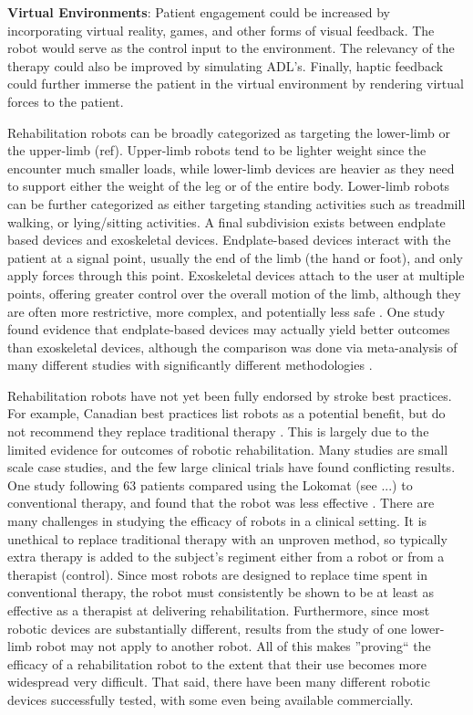 \documentclass[12pt]{report}
\begin{document}
	\textbf{Virtual Environments}: Patient engagement could be increased by incorporating virtual reality, games, and other forms of visual feedback. The robot would serve as the control input to the environment. The relevancy of the therapy could also be improved by simulating ADL's. Finally, haptic feedback could further immerse the patient in the virtual environment by rendering virtual forces to the patient.
	
	Rehabilitation robots can be broadly categorized as targeting the lower-limb or the upper-limb (ref). Upper-limb robots tend to be lighter weight since the encounter much smaller loads, while lower-limb devices are heavier as they need to support either the weight of the leg or of the entire body. Lower-limb robots can be further categorized as either targeting standing activities such as treadmill walking, or lying/sitting activities. A final subdivision exists between endplate based devices and exoskeletal devices. Endplate-based devices interact with the patient at a signal point, usually the end of the limb (the hand or foot), and only apply forces through this point. Exoskeletal devices attach to the user at multiple points, offering greater control over the overall motion of the limb, although they are often more restrictive, more complex, and potentially less safe \cite{Chang2013}. One study found evidence that endplate-based devices may actually yield better outcomes than exoskeletal devices, although the comparison was done via meta-analysis of many different studies with significantly different methodologies \cite{Mehrholz2012} . 
	
	Rehabilitation robots have not yet been fully endorsed by stroke best practices. For example, Canadian best practices list robots as a potential benefit, but do not recommend they replace traditional therapy \cite{Hebert2016}. This is largely due to the limited evidence for outcomes of robotic rehabilitation. Many studies are small scale case studies, and the 
few large clinical trials have found conflicting results. One study following 63 patients compared using the Lokomat (see ...) to conventional therapy, and found that the robot was less effective \cite{Hidler2008}. There are many challenges in studying the efficacy of robots in a clinical setting. It is unethical to replace traditional therapy with an unproven method, so typically extra therapy is added to the subject's regiment either from a robot or from a therapist (control). Since most robots are designed to replace time spent in conventional therapy, the robot must consistently be shown to be at least as effective as a therapist at delivering rehabilitation. Furthermore, since most robotic devices are substantially different, results from the study of one lower-limb robot may not apply to another robot. All of this makes ''proving`` the efficacy of a rehabilitation robot to the extent that their use becomes more widespread very difficult. That said, there have been many different robotic devices successfully tested, with some even being available commercially. 
	
\end{document}
